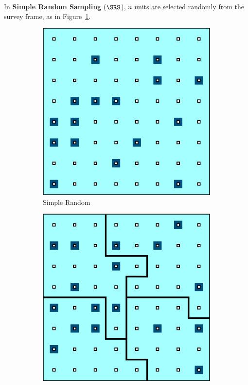 In \textbf{Simple Random Sampling} ($\SRS$), $n$ units are selected randomly from the survey frame, as in Figure~\ref{fig:SRS}. \begin{figure}[t]
\centering
\begin{subfigure}[b]{0.30\textwidth}
\includegraphics[width=\textwidth]{images/DC/Sampling_SRS.png}
\caption{\small Simple Random} 
\label{fig:SRS}
\end{subfigure}\quad
\begin{subfigure}[b]{0.30\textwidth}
\includegraphics[width=\textwidth]{images/DC/Sampling_StS.png}

\end{subfigure}
\end{figure}
